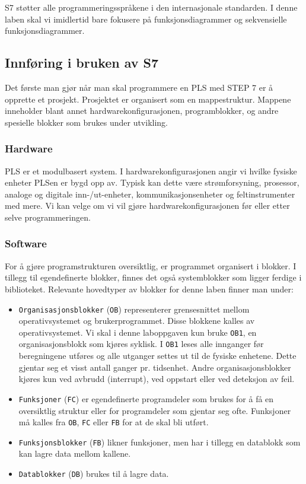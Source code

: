 \begin{alphasection}
S7 støtter alle programmeringsspråkene i den internasjonale standarden. I denne laben skal vi imidlertid bare fokusere på funksjonsdiagrammer og sekvensielle funksjonsdiagrammer.

\subsection{Innføring i bruken av S7}

Det første man gjør når man skal programmere en PLS med STEP 7 er å opprette et prosjekt. Prosjektet er organisert som en mappestruktur. Mappene inneholder blant annet hardwarekonfigurasjonen, programblokker, og andre spesielle blokker som brukes under utvikling.

\subsubsection{Hardware}

PLS er et modulbasert system. I hardwarekonfigurasjonen angir vi hvilke fysiske enheter
PLSen er bygd opp av. Typisk kan dette være strømforsyning, prosessor, analoge og digitale
inn-/ut-enheter, kommunikasjonsenheter og feltinstrumenter med mere. Vi kan velge om vi vil
gjøre hardwarekonfigurasjonen før eller etter selve programmeringen.

\subsubsection{Software}

For å gjøre programstrukturen oversiktlig, er programmet organisert i blokker. I tillegg til egendefinerte blokker, finnes det også systemblokker som ligger ferdige i biblioteket. Relevante hovedtyper av blokker for denne laben finner man under:

\begin{itemize}
    \item \verb|Organisasjonsblokker| (\verb|OB|) representerer grensesnittet mellom operativsystemet og
brukerprogrammet. Disse blokkene kalles av operativsystemet. Vi skal i denne laboppgaven
kun bruke \verb|OB1|, en organisasjonsblokk som kjøres syklisk. I \verb|OB1| leses alle innganger før
beregningene utføres og alle utganger settes ut til de fysiske enhetene. Dette gjentar seg et
visst antall ganger pr. tidsenhet. Andre organisasjonsblokker kjøres kun ved avbrudd
(interrupt), ved oppstart eller ved deteksjon av feil.
\item \verb|Funksjoner| (\verb|FC|) er egendefinerte programdeler som brukes for å få en oversiktlig struktur
eller for programdeler som gjentar seg ofte. Funksjoner må kalles fra \verb|OB|, \verb|FC| eller \verb|FB| for at
de skal bli utført.
\item \verb|Funksjonsblokker| (\verb|FB|) likner funksjoner, men har i tillegg en datablokk som kan lagre data
mellom kallene.
\item \verb|Datablokker| (\verb|DB|) brukes til å lagre data.
\end{itemize}





\end{alphasection}
